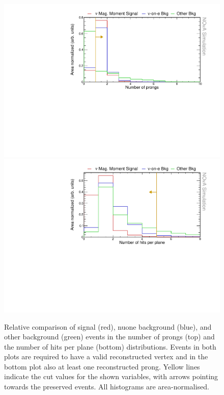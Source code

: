 \begin{figure}[hbtp]
\centering
\includegraphics[width=.9\textwidth]{Plots/NuMMEventSelection/N1Cut_NPng.pdf}
\includegraphics[width=.9\textwidth]{Plots/NuMMEventSelection/N1Cut_NHitsPPlane.pdf}
\caption[Prong and hits reconstruction quality cuts]{Relative comparison of signal (red), \acrshort{nuone} background (blue), and other background (green) events in the number of prongs (top) and the number of hits per plane (bottom) distributions. Events in both plots are required to have a valid reconstructed vertex and in the bottom plot also at least one reconstructed prong. Yellow lines indicate the cut values for the shown variables, with arrows pointing towards the preserved events. All histograms are area-normalised.}
\label{fig:NuMMCutsRecoQuality}
\end{figure}


